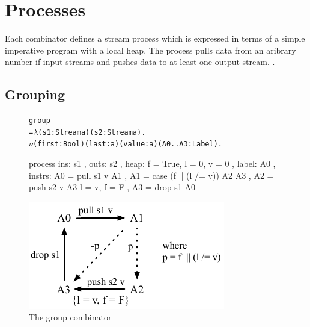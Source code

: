 \section{Processes}
\label{s:Processes}

Each combinator defines a stream process which is expressed in terms of a simple imperative program with a local heap. The process pulls data from an aribrary number if input streams and pushes data to at least one output stream. . 


\subsection{Grouping}
\begin{figure}

\begin{center}
\begin{alltt}
           group 
             = \(\lambda\) (s1: Stream a) (s2: Stream a). 
               \(\nu\) (first: Bool)  (last: a) (value: a) (A0..A3: Label).
\end{alltt}
\begin{code}
               process
               { ins:    { s1 }
               , outs:   { s2 }
               , heap:   { f = True, l = 0, v = 0 }
               , label:  A0
               , instrs: { A0 = pull s1 v            A1 {}
                         , A1 = case (f || (l /= v)) A2 {}  A3 {}
                         , A2 = push s2 v            A3 { l = v, f = F }
                         , A3 = drop s1              A0 {} } }
\end{code}
\end{center}
\vspace{1em}
\includegraphics[scale=1.1]{figures/state-group.pdf}
\caption{The group combinator}
\label{fig:Process:Group}
\end{figure}

